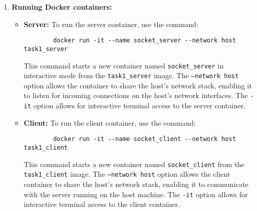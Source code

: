 \documentclass{article}
\begin{document}
\begin{enumerate}
    \item \textbf{Running Docker containers:}
    \begin{itemize}
        \item \textbf{Server:} To run the server container, use the command:
        \begin{verbatim}
        docker run -it --name socket_server --network host task1_server
        \end{verbatim}
        This command starts a new container named \texttt{socket\_server} in interactive mode from the \texttt{task1\_server} image. The \texttt{--network host} option allows the container to share the host's network stack, enabling it to listen for incoming connections on the host's network interfaces. The \texttt{-it} option allows for interactive terminal access to the server container.
        \item \textbf{Client:} To run the client container, use the command:
        \begin{verbatim}
        docker run -it --name socket_client --network host task1_client
        \end{verbatim}
        This command starts a new container named \texttt{socket\_client} from the \texttt{task1\_client} image. The \texttt{--network host} option allows the client container to share the host's network stack, enabling it to communicate with the server running on the host machine. The \texttt{-it} option allows for interactive terminal access to the client container.
    \end{itemize} 
\end{enumerate}
\end{document}
